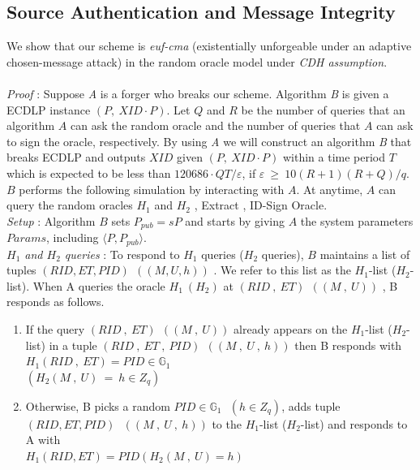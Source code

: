 \documentclass[10pt,journal,letterpaper]{IEEEtran}
\begin{document}
\subsection{Source Authentication and Message Integrity}
We show that our scheme is \emph{euf-cma} (existentially unforgeable under an adaptive chosen-message attack) in the random oracle model under \emph{CDH assumption}. \\ \\
\emph{Proof} : Suppose \emph{A} is a forger who breaks our scheme.
Algorithm \emph{B} is given a ECDLP instance $(P ,\: XID \cdot P)$.
Let $Q$ and $R$ be the number of queries that an algorithm $A$ can
ask the random oracle and the number of queries that $A$ can ask to
sign the oracle, respectively. By using \emph{A} we will construct
an algorithm \emph{B} that breaks ECDLP and outputs $XID$ given $(P
,\: XID \cdot P)$ within a time period $T$ which is expected to be
less
than $120686\cdot QT/\varepsilon$, if $\varepsilon\: \geq\: 10(R+1)(R+Q)/q$. $B$ performs the following simulation by interacting with $A$. At anytime, $A$ can query the random oracles $H_1$ and $H_2$ , Extract , ID-Sign Oracle. \\

\noindent\emph{Setup} : Algorithm $B$ sets $P_{pub} = sP$ and starts by giving $A$ the system parameters $Params$, including $\langle P, P_{pub} \rangle$.\\

\noindent\emph{$H_1$ and $H_2$ queries} : To respond to $H_1$
queries ($H_2$ queries), $B$ maintains a list of tuples $(RID , ET ,
PID) \:\: ((M , U , h))$ . We refer to this list as the $H_1$-list
($H_2$-list). When A queries the oracle $H_1\:(H_2)$ at $(RID \:,
\:ET)\:\:((M\:,\:U))$ , B responds as follows.
\begin{enumerate}
    \item If the query $(RID\: , \: ET)\:\:((M\:,\:U))$ already appears on the $H_1$-list ($H_2$-list) in a tuple $(RID\: , \:ET \:, \:PID)\:\:((M\:,\:U\:,\:h))$ then B responds with $H_1(RID\:,\:ET) = PID\in \mathbb{G}_1$\:\:\:\\$(H_2(M\:,\:U)\:=\:h \in Z_q)$
    \item Otherwise, B picks a random $PID \in \mathbb{G}_1 \:\:\:(h\in Z_q)$, adds tuple $(RID , ET , PID)\:\:\: ((M\:,\:U\:,\:h))$ to the $H_1$-list ($H_2$-list) and responds to A with \\
    $H_1(RID , ET) = PID$\:\:\:$(H_2(M\:,\:U) = h)$ \\
\end{enumerate}
\end{document}
